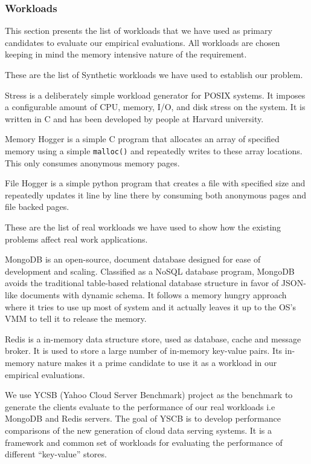       \subsubsection{Workloads}
      
	This section presents the list of workloads that we have used as primary candidates to evaluate our empirical evaluations. All 
    workloads are chosen keeping in mind the memory intensive nature of the requirement.  
	
	These are the list of Synthetic workloads we have used to establish our problem.
	  
	    Stress \cite{stress} is a deliberately simple workload generator for POSIX systems. It imposes a configurable amount of CPU, 
    memory, I/O, and disk stress on the system. It is written in C and has been developed by people at Harvard university. 
	  
	    Memory Hogger is a simple C program that allocates an array of specified memory using a simple \texttt{malloc()} and repeatedly 
    writes to these array locations. This only consumes anonymous memory pages.
	  
	    File Hogger is a simple python program that creates a file with specified size and repeatedly updates it line by line there by 
    consuming both anonymous pages and file backed pages.

	These are the list of real workloads we have used to show how the existing problems affect real work applications.
	  
	    MongoDB \cite{Mongodb} is an open-source, document database designed for ease of development and scaling. Classified as a NoSQL 
    database program, MongoDB avoids the traditional table-based relational database structure in favor of JSON-like documents with dynamic 
    schema. It follows a memory hungry approach where it tries to use up most of system and it actually leaves it up to the OS's VMM to tell it 
    to release the memory.

	    Redis \cite{Redis} is a in-memory data structure store, used as database, cache and message broker. It is used to store a large 
    number of in-memory key-value pairs. Its in-memory nature makes it a prime candidate to use it as a workload in our empirical evaluations.
      
	    We use YCSB \cite{cooper2010benchmarking} (Yahoo Cloud Server Benchmark) project as the benchmark to generate the clients evaluate 
    to the performance of our real workloads i.e MongoDB and Redis servers. The goal of YSCB is to develop performance comparisons of the new 
    generation of cloud data serving systems. It is a framework and common set of workloads for evaluating the performance of different 
    “key-value” stores.
    
